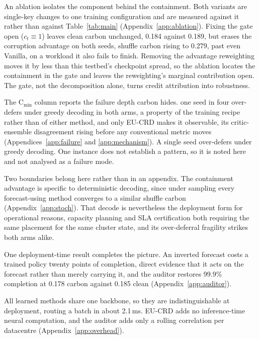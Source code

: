 \documentclass{article} %
\newif\ifFragileUnresolved \FragileUnresolvedfalse
\newcommand{\FragTag}{\ifFragileUnresolved\textcolor{red}{\,[UNRESOLVED]}\fi}
\newif\ifFragileNone   \FragileNonefalse
\newif\ifFragilePattern \FragilePatterntrue
\newcommand{\ResFragileCount}{one seed in four}
\begin{document}
An ablation isolates the component behind the containment. Both variants are single-key changes to one training configuration and are measured against it rather than against Table~\ref{tab:main} (Appendix~\ref{app:ablation}). Fixing the gate open ($c_t\equiv1$) leaves clean carbon unchanged, 0.184 against 0.189, but erases the corruption advantage on both seeds, shuffle carbon rising to 0.279, past even Vanilla, on a workload it also fails to finish. Removing the advantage reweighting moves it by less than this testbed's checkpoint spread, so the ablation locates the containment in the gate and leaves the reweighting's marginal contribution open. The gate, not the decomposition alone, turns credit attribution into robustness.

The C$_{\min}$ column reports the failure depth carbon hides.
\ifFragileNone
Every seed in both arms holds completion inside the contract under greedy decoding, so the column records no failure to explain.
\else\ifFragilePattern
\ResFragileCount{}\FragTag{} over-defers under greedy decoding in both arms, a property of the training recipe rather than of either method, and only EU-CRD makes it observable, its critic-ensemble disagreement rising before any conventional metric moves (Appendices~\ref{app:failure} and \ref{app:mechanism}).
\else
A single seed over-defers under greedy decoding. One instance does not establish a pattern, so it is noted here and not analysed as a failure mode.
\fi\fi

Two boundaries belong here rather than in an appendix. The containment advantage is specific to deterministic decoding, since under sampling every forecast-using method converges to a similar shuffle carbon (Appendix~\ref{app:stoch}). That decode is nevertheless the deployment form for operational reasons, capacity planning and SLA certification both requiring the same placement for the same cluster state, and its over-deferral fragility strikes both arms alike.

One deployment-time result completes the picture. An inverted forecast costs a trained policy twenty points of completion, direct evidence that it acts on the forecast rather than merely carrying it, and the auditor restores 99.9\% completion at 0.178 carbon against 0.185 clean (Appendix~\ref{app:auditor}).

All learned methods share one backbone, so they are indistinguishable at deployment, routing a batch in about 2.1\,ms. EU-CRD adds no inference-time neural computation, and the auditor adds only a rolling correlation per datacentre (Appendix~\ref{app:overhead}).
\end{document}
